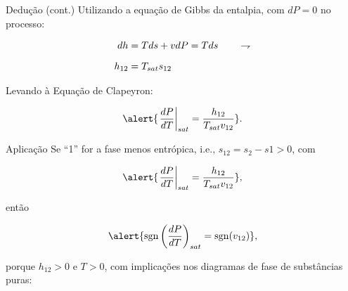     \begin{frame}{Dedução (cont.)}\vspace*{-1em}
        Utilizando a equação de Gibbs da entalpia, com \alert{$dP=0$} no processo:

        \begin{align*}
            dh &= Tds + vdP = Tds
            \qquad\rightharpoondown\\[\medskipamount]
            h_{12} &= T_{sat}s_{12}
        \end{align*}

        Levando à \alert{Equação de Clapeyron}:

        \begin{equation*}
            \alert{
                \left.\frac{dP}{dT}\right|_{sat} =
                \frac{h_{12}}{T_{sat}v_{12}}
            }.
        \end{equation*}
    \end{frame}

    \begin{frame}{Aplicação}\vspace*{-1em}
        Se ``\alert{1}'' for a fase \alert{menos entrópica}, i.e., \alert{$s_{12} = s_2 - s1 >
        0$}, com

        \begin{equation*}
            \alert{
                \left.\frac{dP}{dT}\right|_{sat} =
                \frac{h_{12}}{T_{sat}v_{12}}
            },
        \end{equation*}

        então

        \begin{equation*}
            \alert{
                \operatorname{sgn}\left(\frac{dP}{dT}\right)_{sat} =
                \operatorname{sgn}(v_{12})
            },
        \end{equation*}\vspace*\medskipamount

        porque \alert{$h_{12} > 0$} e \alert{$T > 0$}, com implicações nos \alert{diagramas de
        fase} de substâncias puras:

    \end{frame}

